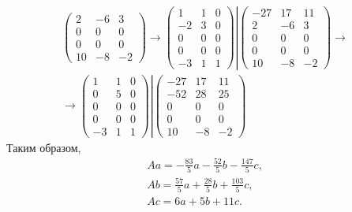 \documentclass[12pt]{article}
\begin{document}
\begin{gather*}
\begin{pmatrix}
            2   & -6 & 3  \\
            0   & 0  & 0  \\
            0   & 0  & 0  \\
            10  & -8 & -2
        \end{pmatrix}
        \rightarrow
        \left .
        \begin{pmatrix}
            1  & 1 & 0 \\
            -2 & 3 & 0 \\
            0  & 0 & 0 \\
            0  & 0 & 0 \\
            -3 & 1 & 1
        \end{pmatrix}
        \right |
        \begin{pmatrix}
            -27 & 17 & 11 \\
            2   & -6 & 3  \\
            0   & 0  & 0  \\
            0   & 0  & 0  \\
            10  & -8 & -2
        \end{pmatrix}
        \rightarrow \\
        \rightarrow
        \left .
        \begin{pmatrix}
            1  & 1 & 0 \\
            0  & 5 & 0 \\
            0  & 0 & 0 \\
            0  & 0 & 0 \\
            -3 & 1 & 1
        \end{pmatrix}
        \right |
        \begin{pmatrix}
            -27 & 17 & 11 \\
            -52 & 28 & 25 \\
            0   & 0  & 0  \\
            0   & 0  & 0  \\
            10  & -8 & -2
        \end{pmatrix}
    \end{gather*}
    Таким образом,
    \begin{gather*}
        Aa = - \frac{83}{5} a - \frac{52}{5} b - \frac{147}{5} c , \\
        Ab = \frac{57}{5} a + \frac{28}{5} b + \frac{103}{5} c , \\
        Ac = 6 a + 5 b + 11 c .
    \end{gather*}
\end{document}
